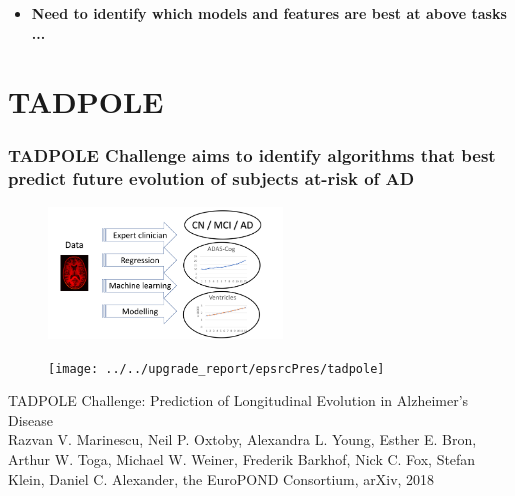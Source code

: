 \documentclass[8pt,xcolor=table]{beamer}
\begin{document}
\begin{frame}
\begin{itemize}
 
 \vspace{1em}
  \item[] \textbf{Need to identify which models and features are best at above tasks ...}
 \vspace{1em}
\end{itemize}


 

\end{frame}



\section{TADPOLE}

\begin{frame}
\frametitle{TADPOLE Challenge aims to identify algorithms that best predict future evolution of subjects at-risk of AD}

\vspace{-3em}
\begin{figure}[H]
\centering
\includegraphics[height=3.5cm]{../tadpole_diagram} 
\end{figure}

\begin{figure}[H]
\centering
\texttt{[image: ../../upgrade\_report/epsrcPres/tadpole]} 
\end{figure}

\footnotesize{TADPOLE Challenge: Prediction of Longitudinal Evolution in Alzheimer's Disease\\
Razvan V. Marinescu, Neil P. Oxtoby, Alexandra L. Young, Esther E. Bron, Arthur W. Toga, Michael W. Weiner, Frederik Barkhof, Nick C. Fox, Stefan Klein, Daniel C. Alexander, the EuroPOND Consortium, arXiv, 2018} 

\end{frame}
\end{document}
